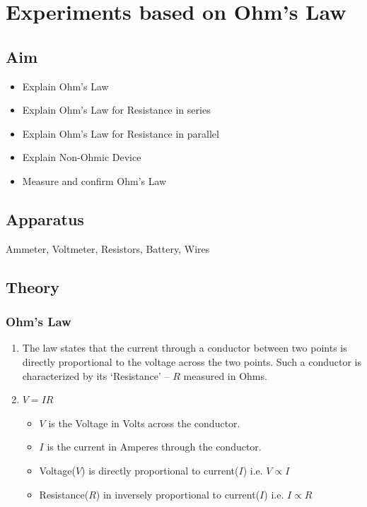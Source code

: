 \chapter{Experiments based on Ohm's Law}
	\section{Aim}
		\begin{itemize}
			\tightlist
			\item Explain Ohm's Law
			\item Explain Ohm's Law for Resistance in series
			\item Explain Ohm's Law for Resistance in parallel
			\item Explain Non-Ohmic Device
			\item Measure and confirm Ohm's Law
		\end{itemize}

	\section{Apparatus}
		Ammeter, Voltmeter, Resistors, Battery, Wires
		
	\section{Theory}
		\subsection{Ohm's Law}
			\begin{enumerate}
				\item The law states that the current through a conductor between two points is directly proportional to the voltage across the two points. Such a conductor is characterized by its ‘Resistance’ – $R$ measured in Ohms.
				\item $V = IR$
					\begin{itemize}
						\tightlist
						\item $V$ is the Voltage in Volts across the conductor.
						\item $I$ is the current in Amperes through the conductor.
						\item Voltage($V$) is directly proportional to current($I$) i.e. $V \propto I$
						\item Resistance($R$) in inversely proportional to current($I$) i.e. $I \propto R$
					\end{itemize}
			\end{enumerate}
		
